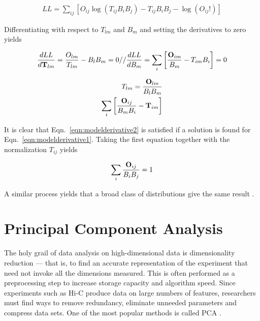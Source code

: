 \begin{align}
  \label{eqn:llmodel}
  LL = \sum_{ij}\left[O_{ij}\log{(T_{ij}B_{i}B_{j})} - T_{ij}B_{i}B_{j} - \log{(O_{ij}!)}\right]
\end{align}

Differentiating with respect to $T_{lm}$ and $B_m$ and setting the derivatives to zero yields

\begin{multicols}{2}
  \begin{align}
    \label{eqn:modelderivative1}
    \begin{split}
      \frac{dLL}{d\mathbf{T}_{lm}} = \frac{O_{lm}}{T_{lm}} - B_{l}B_{m} = 0
      //
      \frac{dLL}{dB_{m}} = \sum_i\left[\frac{\mathbf{O}_{im}}{B_m} - T_{im}B_i\right] = 0
    \end{split}
  \end{align}

  \break%

  \begin{align}
    \label{eqn:modelderivative2}
    \begin{split}
      T_{lm} = \frac{\mathbf{O}_{lm}}{B_{l}B_{m}}
      \\
      \sum_i\left[\frac{\mathbf{O}_{ij}}{B_{m}B_{i}} - \mathbf{T}_{im}\right]
    \end{split}
  \end{align}
\end{multicols}

It is clear that Eqn.~\eqref{eqn:modelderivative2} is satisfied if a solution is found for Eqn.~\eqref{eqn:modelderivative1}.  Taking the first equation together  with the
normalization $T_{ij}$ yields

\begin{align}
  \label{eqn:result}
  \sum_i \frac{\mathbf{O}_{ij}}{B_{i}B_{j}} = 1
\end{align}

A similar process yields that a broad class of distributions give the same result \citep{imakaev2012}.

\section*{Principal Component Analysis}

The holy grail of data analysis on high-dimensional data is dimensionality reduction --- that is, to find an accurate representation of
the experiment that need not invoke all the dimensions measured.  This is often performed as a preprocessing step to increase storage capacity
and algorithm speed.  Since experiments such as Hi-C produce data on large numbers of features, researchers must find ways to remove redundancy,
eliminate unneeded parameters and compress data sets.  One of the most popular methods is called \gls{PCA} \citep{law1987}.

